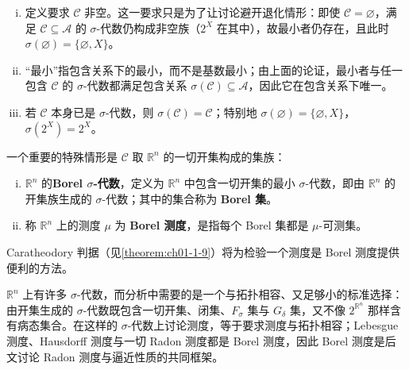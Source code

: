 \documentclass[../../main.tex]{subfiles}
\begin{document}
\begin{remark}\label{remark:ch01-def-1-5-生成条件}
\begin{enumerate}[(i)]
\item 定义要求 $\mathcal{C}$ 非空。这一要求只是为了让讨论避开退化情形：即使 $\mathcal{C}=\varnothing$，满足 $\mathcal{C}\subseteq\mathcal{A}$ 的 $\sigma$-代数仍构成非空族（$2^{X}$ 在其中），故最小者仍存在，且此时 $\sigma(\varnothing)=\{\varnothing,X\}$。
\item “最小”指包含关系下的最小，而不是基数最小；由上面的论证，最小者与任一包含 $\mathcal{C}$ 的 $\sigma$-代数都满足包含关系 $\sigma(\mathcal{C})\subseteq\mathcal{A}$，因此它在包含关系下唯一。
\item 若 $\mathcal{C}$ 本身已是 $\sigma$-代数，则 $\sigma(\mathcal{C})=\mathcal{C}$；特别地 $\sigma(\varnothing)=\{\varnothing,X\}$，$\sigma(2^{X})=2^{X}$。
\end{enumerate}
\end{remark}

一个重要的特殊情形是 $\mathcal{C}$ 取 $\mathbb{R}^{n}$ 的一切开集构成的集族：

\begin{definition}\label{definition:ch01-1-6}
\begin{enumerate}[(i)]
\item $\mathbb{R}^{n}$ 的\textbf{Borel $\sigma$-代数}，定义为 $\mathbb{R}^{n}$ 中包含一切开集的最小 $\sigma$-代数，即由 $\mathbb{R}^{n}$ 的开集族生成的 $\sigma$-代数；其中的集合称为 \textbf{Borel 集}。
\item 称 $\mathbb{R}^{n}$ 上的测度 $\mu$ 为 \textbf{Borel 测度}，是指每个 Borel 集都是 $\mu$-可测集。
\end{enumerate}
\end{definition}

Caratheodory 判据（见\cref{theorem:ch01-1-9}）将为检验一个测度是 Borel 测度提供便利的方法。%

\begin{remark}\label{remark:ch01-def-1-6-拓扑动机}
$\mathbb{R}^{n}$ 上有许多 $\sigma$-代数，而分析中需要的是一个与拓扑相容、又足够小的标准选择：由开集生成的 $\sigma$-代数既包含一切开集、闭集、$F_{\sigma}$ 集与 $G_{\delta}$ 集，又不像 $2^{\mathbb{R}^{n}}$ 那样含有病态集合。在这样的 $\sigma$-代数上讨论测度，等于要求测度与拓扑相容；Lebesgue 测度、Hausdorff 测度与一切 Radon 测度都是 Borel 测度，因此 Borel 测度是后文讨论 Radon 测度与逼近性质的共同框架。
\end{remark}
\end{document}
